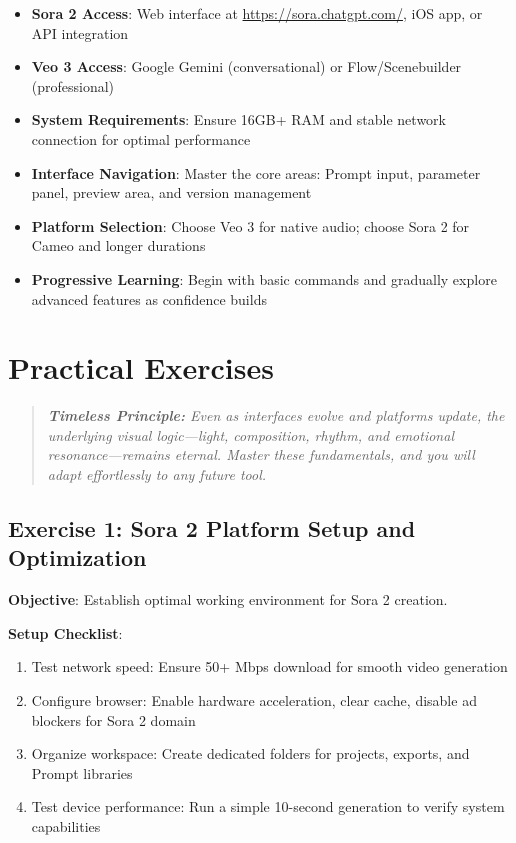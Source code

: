 \begin{itemize}
\item \textbf{Sora 2 Access}: Web interface at \url{https://sora.chatgpt.com/}, iOS app, or API integration
\item \textbf{Veo 3 Access}: Google Gemini (conversational) or Flow/Scenebuilder (professional)
\item \textbf{System Requirements}: Ensure 16GB+ RAM and stable network connection for optimal performance
\item \textbf{Interface Navigation}: Master the core areas: Prompt input, parameter panel, preview area, and version management
\item \textbf{Platform Selection}: Choose Veo 3 for native audio; choose Sora 2 for Cameo and longer durations
\item \textbf{Progressive Learning}: Begin with basic commands and gradually explore advanced features as confidence builds
\end{itemize}

\section*{Practical Exercises}

\begin{quote}
\textit{\textbf{Timeless Principle:} Even as interfaces evolve and platforms update, the underlying visual logic---light, composition, rhythm, and emotional resonance---remains eternal. Master these fundamentals, and you will adapt effortlessly to any future tool.}
\end{quote}

\subsection*{Exercise 1: Sora 2 Platform Setup and Optimization}
\textbf{Objective}: Establish optimal working environment for Sora 2 creation.

\textbf{Setup Checklist}:
\begin{enumerate}
\item Test network speed: Ensure 50+ Mbps download for smooth video generation
\item Configure browser: Enable hardware acceleration, clear cache, disable ad blockers for Sora 2 domain
\item Organize workspace: Create dedicated folders for projects, exports, and Prompt libraries
\item Test device performance: Run a simple 10-second generation to verify system capabilities
\end{enumerate}

